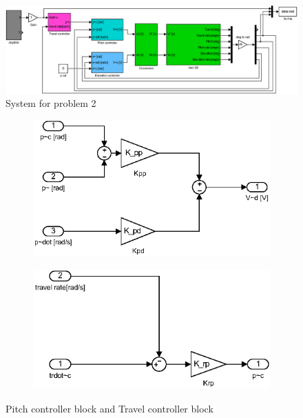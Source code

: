 \begin{figure}[H]
    \begin{center}
    \includegraphics[width=1\linewidth]{Part2_pictures/p2p2sys.eps}
    \caption{System for problem 2}
    \end{center}
\end{figure}

\begin{figure}[H]
\begin{subfigure}{0.5\textwidth}
    \includegraphics[width=0.9\linewidth]{Part2_pictures/p2p1_pd.eps} 
\end{subfigure}
\begin{subfigure}{0.5\textwidth}
    \includegraphics[width=0.9\linewidth]{Part2_pictures/p2p2_p.eps}
\end{subfigure}
\caption{Pitch controller block and Travel controller block}
\end{figure}

